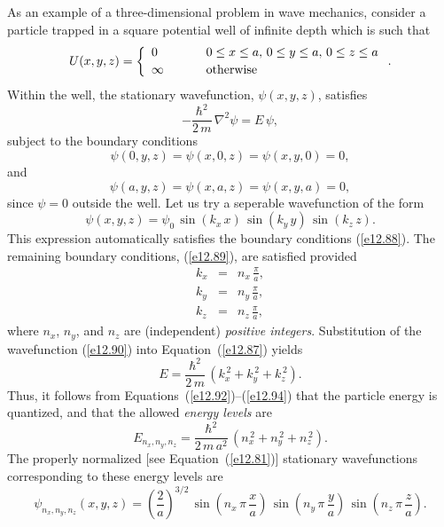 As an example of a three-dimensional problem in wave mechanics, consider a particle trapped in a  square potential well  of infinite depth which is
such that
\begin{equation}
U(x,y,z) = \left\{
\begin{array}{lll}
0&\mbox{\hspace{0.5cm}}&0\leq x \leq a,\, 0\leq y \leq a,\, 0\leq z\leq a\\[0.5ex]
\infty &&\mbox{otherwise}
\end{array}\right..
\end{equation}
Within the well, the stationary wavefunction, $\psi(x,y,z)$, satisfies
\begin{equation}\label{e12.87}
- \frac{\hbar^2}{2\,m}\,\nabla^2\psi  = E\,\psi,
\end{equation}
subject to the boundary conditions
\begin{equation}\label{e12.88}
\psi(0,y,z) = \psi(x,0,z)=\psi(x,y,0) =0,
\end{equation}
and
\begin{equation}\label{e12.89}
\psi(a,y,z) = \psi(x,a,z)=\psi(x,y,a) =0,
\end{equation}
since $\psi=0$ outside the well.
Let us try a seperable wavefunction of the form
\begin{equation}\label{e12.90}
\psi(x,y,z) =\psi_0\,\sin(k_x\,x)\,\sin(k_y\,y)\,\sin(k_z\,z).
\end{equation}
This expression automatically satisfies the boundary conditions (\ref{e12.88}). The
remaining boundary conditions, (\ref{e12.89}),  are satisfied provided
\begin{eqnarray}\label{e12.92}
k_x &=& n_x\,\frac{\pi}{a},\\[0.5ex]
k_y &=&n_y\,\frac{\pi}{a},\\[0.5ex]
k_z &=& n_z\,\frac{\pi}{a},\label{e12.94}
\end{eqnarray}
where $n_x$, $n_y$, and $n_z$ are (independent) {\em positive integers}. 
Substitution of the wavefunction (\ref{e12.90}) into Equation~(\ref{e12.87})
yields
\begin{equation}
E = \frac{\hbar^2}{2\,m}\,(k_x^{\,2} + k_y^{\,2}+k_z^{\,2}).
\end{equation}
Thus, it follows from Equations~(\ref{e12.92})--(\ref{e12.94}) that the particle energy is quantized, and that the
allowed {\em energy levels}\/ are
\begin{equation}\label{e12.95}
E_{n_x,n_y,n_z} = \frac{\hbar^2}{2\,m\,a^2}\,(n_x^{\,2}+n_y^{\,2}+n_z^{\,2}).
\end{equation}
The properly normalized [see Equation~(\ref{e12.81})] stationary wavefunctions corresponding to
these energy levels are
\begin{equation}
\psi_{n_x,n_y,n_z}(x,y,z) = \left(\frac{2}{a}\right)^{3/2}\,\sin\left(n_x\,\pi\,\frac{x}{a}\right)\,\sin\left(n_y\,\pi\,\frac{y}{a}\right)\,\sin\left(n_z\,\pi\,\frac{z}{a}\right).
\end{equation}

